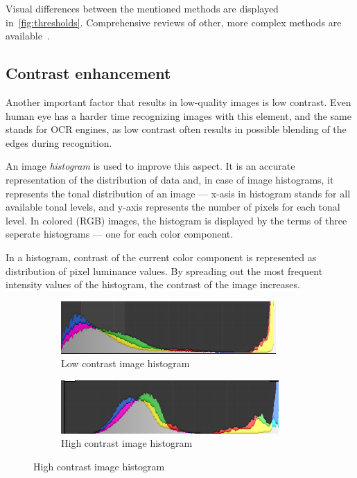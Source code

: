 Visual differences between the mentioned methods are displayed in~\cref{fig:thresholds}. Comprehensive reviews of other, more complex methods are available~\citep{localOtherBin}.

\subsection{Contrast enhancement}

Another important factor that results in low-quality images is low contrast. Even human eye has a harder time recognizing images 
with this element, and the same stands for OCR engines, as low contrast often results in possible blending of the edges during recognition.

An image \emph{histogram} is used to improve this aspect. It is an accurate representation of the distribution of data and, in case of image histograms, it represents the tonal distribution of an image --- x-asis in histogram stands for all available tonal levels, and y-axis represents the number of pixels for each tonal level. In colored (RGB) images, the histogram is displayed by the terms of three seperate histograms --- one for each color component.

In a histogram, contrast of the current color component is represented as distribution of pixel luminance values. By spreading out the most frequent intensity values of the histogram, the contrast of the image increases.

\begin{figure}[H]
\centering
\begin{subfigure}{0.31\textwidth}
\includegraphics[width=\linewidth]{img/preprocessing//histogram_low.png}
\caption{Low contrast image histogram} \label{fig:1a}
\end{subfigure}
\qquad
\begin{subfigure}{0.31\textwidth}
\includegraphics[width=\linewidth]{img/preprocessing/histogram_high.png}
\caption{High contrast image histogram} \label{fig:1b}
\end{subfigure}
\end{figure}

